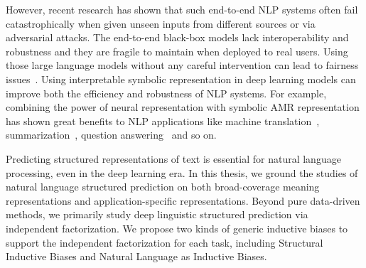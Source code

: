 However, recent research has shown that such end-to-end NLP systems
often fail catastrophically when given unseen inputs from different
sources or via adversarial attacks. The end-to-end black-box models
lack interoperability and robustness and they are fragile to maintain
when deployed to real users. Using those large language models without
any careful intervention can lead to fairness
issues~\citep{bommasani2021opportunities}.  Using interpretable
symbolic representation in deep learning models can improve both the
efficiency and robustness of NLP systems. For example, combining the
power of neural representation with symbolic AMR representation has
shown great benefits to NLP applications like machine
translation~\citep{song2019semantic},
summarization~\citep{liu2015toward}, question
answering~\citep{kapanipathi2021leveraging} and so on.

Predicting structured representations of text is essential for natural
language processing, even in the deep learning era. In this thesis, we
ground the studies of natural language structured prediction on both
broad-coverage meaning representations and application-specific
representations. Beyond pure data-driven methods, we primarily study
deep linguistic structured prediction via independent
factorization. We propose two kinds of generic inductive biases to
support the independent factorization for each task, including
Structural Inductive Biases and Natural Language as Inductive Biases.


%





